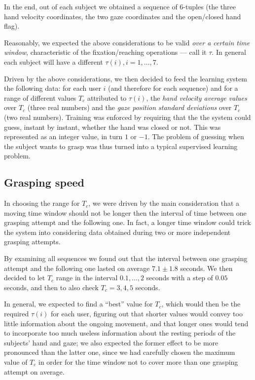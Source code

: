 \documentclass[a4paper,10pt,conference]{ieeeconf}
\begin{document}
In the end, out of each subject we obtained a sequence of $6$-tuples
(the three hand velocity coordinates, the two gaze coordinates and the
open/closed hand flag).

Reasonably, we expected the above considerations to be valid
\emph{over a certain time window}, characteristic of the
fixation/reaching operations --- call it $\tau$. In general each
subject will have a different $\tau(i), i=1,\ldots,7$.

Driven by the above considerations, we then decided to feed the
learning system the following data: for each user $i$ (and therefore
for each sequence) and for a range of different values $T_c$
attributed to $\tau(i)$, the \emph{hand velocity average values} over
$T_c$ (three real numbers) and the \emph{gaze position standard
deviations} over $T_c$ (two real numbers). Training was enforced by
requiring that the the system could guess, instant by instant, whether
the hand was closed or not. This was represented as an integer value,
in turn $1$ or $-1$. The problem of guessing when the subject wants to
grasp was thus turned into a typical supervised learning problem.

\subsection{Grasping speed}

In choosing the range for $T_c$, we were driven by the main
consideration that a moving time window should not be longer then the
interval of time between one grasping attempt and the following
one. In fact, a longer time window could trick the system into
considering data obtained during two or more independent grasping
attempts.

By examining all sequences we found out that the interval between one
grasping attempt and the following one lasted on average $7.1 \pm 1.8$
seconds. We then decided to let $T_c$ range in the interval
$0.1,\ldots,2$ seconds with a step of $0.05$ seconds, and then to also
check $T_c=3,4,5$ seconds.

In general, we expected to find a ``best'' value for $T_c$, which
would then be the required $\tau(i)$ for each user, figuring out that
shorter values would convey too little information about the ongoing
movement, and that longer ones would tend to incorporate too much
useless information about the resting periods of the subjects' hand
and gaze; we also expected the former effect to be more pronounced
than the latter one, since we had carefully chosen the maximum value
of $T_c$ in order for the time window not to cover more than one
grasping attempt on average.
\end{document}
